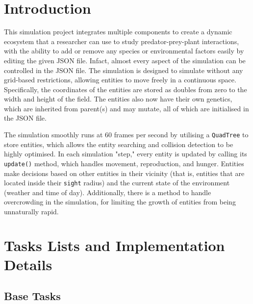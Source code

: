 \documentclass[10pt, a4paper]{scrartcl}
\begin{document}
  \begin{multicols}{2}


    \section{Introduction}

    \noindent This simulation project integrates multiple components to create a dynamic ecosystem that a researcher can use to
    study predator-prey-plant interactions, with the ability to add or remove any species or environmental factors easily
    by editing the given JSON file. Infact, almost every aspect of the simulation can be controlled in the JSON file.
    The simulation is designed to simulate without any grid-based restrictions, allowing entities to move freely in a
    continuous space. Specifically, the coordinates of the entities are stored as doubles from zero to the width and height
    of the field. The entities also now have their own genetics, which are inherited from parent(s) and may mutate,
    all of which are initialised in the JSON file.

    \noindent The simulation smoothly runs at 60 frames per second by utilising a \verb|QuadTree| to store entities, which allows
    the entity searching and collision detection to be highly optimised. In each simulation "step," every entity is updated
    by calling its \verb|update()| method, which handles movement, reproduction, and hunger.
    Entities make decisions based on other entities in their vicinity (that is, entities that are located inside their
    \verb|sight| radius) and the current state of the environment (weather and time of day). Additionally, there is a
    method to handle overcrowding in the simulation, for limiting the growth of entities from being unnaturally rapid.

    \section{Tasks Lists and Implementation Details}

    \subsection{Base Tasks}


\end{multicols}
\end{document}
